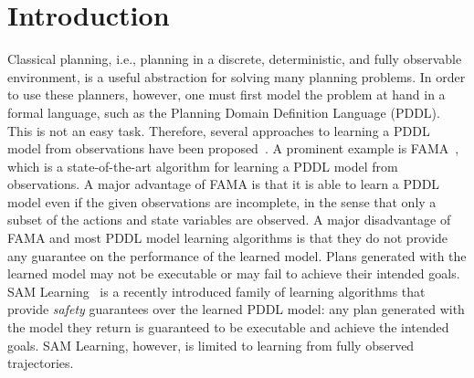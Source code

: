 \documentclass{article}
\theoremstyle{plain}
\theoremstyle{definition}
\theoremstyle{remark}
\theoremstyle{observation}
\begin{document}
\begin{abstract}

\end{abstract}

\section{Introduction} 

Classical planning, i.e., planning in a discrete, deterministic, and fully observable environment, is a useful abstraction for solving many planning problems.
In order to use these planners, however, one must first model the problem at hand in a formal language, such as the Planning Domain Definition Language (PDDL). This is not an easy task. Therefore, several approaches to learning a PDDL model from observations have been proposed~\citep{aineto2019learning,stern2017efficientAndSafe,juba2021safe,cresswell2013acquiring,wu2007arms}. A prominent example is FAMA~\citep{aineto2019learning}, which is a state-of-the-art algorithm for learning a PDDL model from observations. A major advantage of FAMA is that it is able to learn a PDDL model even if the given observations are incomplete, in the sense that only a subset of the actions and state variables are observed. 
A major disadvantage of FAMA and most PDDL model learning algorithms is that they do not provide any guarantee on the performance of the learned model. 
Plans generated with the learned model may not be executable or may fail to achieve their intended goals. 
SAM Learning~\citep{stern2017efficientAndSafe,juba2021safe,juba2022learning,mordoch2022collaborative} is a recently introduced family of learning algorithms that provide \emph{safety} guarantees over the learned PDDL model: any plan generated with the model they return is guaranteed to be executable and achieve the intended goals. 
SAM Learning, however, is limited to learning from fully observed trajectories. 
\end{document}
